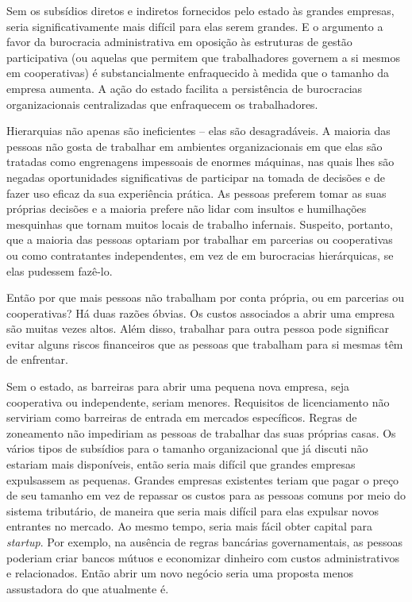 Sem os subsídios diretos e indiretos fornecidos pelo estado às grandes empresas, seria significativamente mais difícil para elas serem grandes. E o argumento a favor da burocracia administrativa em oposição às estruturas de gestão participativa (ou aquelas que permitem que trabalhadores governem a si mesmos em cooperativas) é substancialmente enfraquecido à medida que o tamanho da empresa aumenta. A ação do estado facilita a persistência de burocracias organizacionais centralizadas que enfraquecem os trabalhadores.

Hierarquias não apenas são ineficientes -- elas são desagradáveis. A maioria das pessoas não gosta de trabalhar em ambientes organizacionais em que elas são tratadas como engrenagens impessoais de enormes máquinas, nas quais lhes são negadas oportunidades significativas de participar na tomada de decisões e de fazer uso eficaz da sua experiência prática. As pessoas preferem tomar as suas próprias decisões e a maioria prefere não lidar com insultos e humilhações mesquinhas que tornam muitos locais de trabalho infernais. Suspeito, portanto, que a maioria das pessoas optariam por trabalhar em parcerias ou cooperativas ou como contratantes independentes, em vez de em burocracias hierárquicas, se elas pudessem fazê-lo.

Então por que mais pessoas não trabalham por conta própria, ou em parcerias ou cooperativas? Há duas razões óbvias. Os custos associados a abrir uma empresa são muitas vezes altos. Além disso, trabalhar para outra pessoa pode significar evitar alguns riscos financeiros que as pessoas que trabalham para si mesmas têm de enfrentar.

Sem o estado, as barreiras para abrir uma pequena nova empresa, seja cooperativa ou independente, seriam menores. Requisitos de licenciamento não serviriam como barreiras de entrada em mercados específicos. Regras de zoneamento não impediriam as pessoas de trabalhar das suas próprias casas. Os vários tipos de subsídios para o tamanho organizacional que já discuti não estariam mais disponíveis, então seria mais difícil que grandes empresas expulsassem as pequenas. Grandes empresas existentes teriam que pagar o preço de seu tamanho em vez de repassar os custos para as pessoas comuns por meio do sistema tributário, de maneira que seria mais difícil para elas expulsar novos entrantes no mercado. Ao mesmo tempo, seria mais fácil obter capital para \emph{startup}. Por exemplo, na ausência de regras bancárias governamentais, as pessoas poderiam criar bancos mútuos e economizar dinheiro com custos administrativos e relacionados. Então abrir um novo negócio seria uma proposta menos assustadora do que atualmente é.

